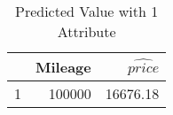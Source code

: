 \begin{table}[ht]
\centering
\begin{tabular}{rrr}
  \hline
 & Mileage & $\widehat{price}$ \\ 
  \hline
1 & 100000 & 16676.18 \\ 
   \hline
\end{tabular}
\caption{Predicted Value with 1 Attribute} 
\label{tab:1p_predict}
\end{table}
